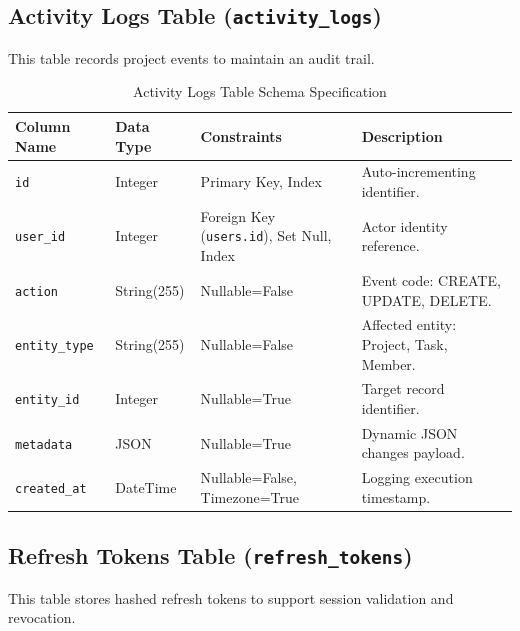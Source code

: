\subsection{Activity Logs Table (\texttt{activity\_logs})}
This table records project events to maintain an audit trail.

\begin{table}[h!]
\centering
\small
\renewcommand{\arraystretch}{1.4}
\begin{tabularx}{\textwidth}{l l l X}
    \toprule[1.5pt]
    \rowcolor{primary!5}
    \textbf{\color{primary}Column Name} & \textbf{\color{primary}Data Type} & \textbf{\color{primary}Constraints} & \textbf{\color{primary}Description} \\
    \midrule
    \texttt{id} & Integer & Primary Key, Index & Auto-incrementing identifier. \\
    \texttt{user\_id} & Integer & Foreign Key (\texttt{users.id}), Set Null, Index & Actor identity reference. \\
    \texttt{action} & String(255) & Nullable=False & Event code: CREATE, UPDATE, DELETE. \\
    \texttt{entity\_type} & String(255) & Nullable=False & Affected entity: Project, Task, Member. \\
    \texttt{entity\_id} & Integer & Nullable=True & Target record identifier. \\
    \texttt{metadata} & JSON & Nullable=True & Dynamic JSON changes payload. \\
    \texttt{created\_at} & DateTime & Nullable=False, Timezone=True & Logging execution timestamp. \\
    \bottomrule[1.5pt]
\end{tabularx}
\caption{Activity Logs Table Schema Specification}
\label{tab:activity_logs_table}
\end{table}

\subsection{Refresh Tokens Table (\texttt{refresh\_tokens})}
This table stores hashed refresh tokens to support session validation and revocation.

